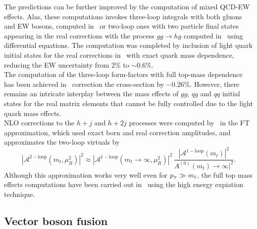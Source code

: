 The predictions can be further improved by the computation of mixed QCD-EW effects. Alas, these computations invokes three-loop integrals with both gluons and EW bosons, computed in~\cite{Bonetti:2017ovy} or two-loop ones with two particle final states appearing in the real corrections with the process $ gg \to hg$ computed in~\cite{Bonetti:2020hqh} using differential equations. The computation was completed by inclusion of light quark initial states for the real corrections in~\cite{Becchetti:2020wof} with exact quark mass dependence, reducing the EW uncertainty from $2\%$ to $ \sim 0.6\%$.  \\ The computation of the three-loop form-factors with full top-mass dependence  has been achieved in~\cite{Czakon:2020vql,Czakon:2021yub} correction the cross-section by $-0.26\%$. However, there remains an intricate interplay between the mass effects of $gg$, $qg$ and $qq$ initial states for the real matrix elements that cannot be fully controlled due to the light quark mass effects. \\ NLO corrections to the $h +j$ and $ h+2j$ processes were computed by~\cite{Maltoni:2014eza} in the FT approximation, which used exact born and real correction amplitudes, and approximates the two-loop virtuals by
\begin{equation}
|	\mathcal A^{\mathrm{2-loop}}(m_t,\mu_R^2) |^2 \approx  |	\mathcal A^{\mathrm{1-loop}}(m_t\to \infty,\mu_R^2) |^2\, \frac{|	\mathcal A^{\mathrm{1-loop}}(m_t) |^2}{A^{\mathrm{(0)}}(m_t)\to \infty |^2}. 
\end{equation}
Although this approximation works very well even for $ p_{\scriptscriptstyle T} \gg m_t$, the full top mass effects computations have been carried out in~\cite{Kudashkin:2017skd,Lindert:2018iug,PhysRevLett.120.162001} using the high energy expiation technique. 
\subsection{Vector boson fusion}

